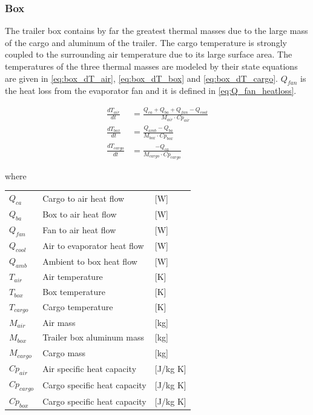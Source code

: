 \subsubsection{Box}
The trailer box contains by far the greatest thermal masses due to the large mass of the cargo and aluminum of the trailer. The cargo temperature is strongly coupled to the surrounding air temperature due to its large surface area. The temperatures of the three thermal masses are modeled by their state equations are given in \cref{eq:box_dT_air}, \cref{eq:box_dT_box} and \cref{eq:box_dT_cargo}. $Q_{fan}$ is the heat loss from the evaporator fan and it is defined in \cref{eq:Q_fan_heatloss}.

\begin{align}
	\frac{dT_{air}}{dt} & = \frac{Q_{ca} + Q_{ba} + Q_{fan} -Q_{cool}}{M_{air} \cdot Cp_{air}} 		\label{eq:box_dT_air}\\
	\frac{dT_{box}}{dt} & = \frac{Q_{amb} - Q_{ba}}{M_{box} \cdot Cp_{box}} 						\label{eq:box_dT_box}\\
	\frac{dT_{cargo}}{dt} & = \frac{-Q_{ca}}{M_{cargo} \cdot Cp_{cargo}}							\label{eq:box_dT_cargo}
\end{align}

where
\begin{center}
	\begin{tabular}{l p{8cm} l}
		$Q_{ca}$     & Cargo to air heat flow       & [\si{W}]                \\
		$Q_{ba}$     & Box to air heat flow         & [\si{W}]                \\
		$Q_{fan}$    & Fan to air heat flow         & [\si{W}]                \\
		$Q_{cool}$   & Air to evaporator heat flow  & [\si{W}]                \\
		$Q_{amb}$    & Ambient to box heat flow     & [\si{W}]                \\
		$T_{air}$    & Air temperature              & [\si{K}]                \\
		$T_{box}$    & Box temperature              & [\si{K}]                \\
		$T_{cargo}$  & Cargo temperature            & [\si{K}]                \\
		$M_{air}$    & Air mass                     & [\si{kg}]               \\
		$M_{box}$    & Trailer box aluminum mass    & [\si{kg}]               \\
		$M_{cargo}$  & Cargo mass                   & [\si{kg}]               \\
		$Cp_{air}$   & Air specific heat capacity   & [\si{J}/\si{kg} \si{K}] \\
		$Cp_{cargo}$ & Cargo specific heat capacity & [\si{J}/\si{kg} \si{K}] \\
		$Cp_{box}$   & Cargo specific heat capacity & [\si{J}/\si{kg} \si{K}]
	\end{tabular}
\end{center}


